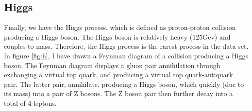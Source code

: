 \subsection*{Higgs}
Finally, we have the Higgs process, which is defined as proton-proton collision producing a Higgs boson. The Higgs boson is relatively heavy (125Gev) and couples to mass. Therefore, the 
Higgs process is the rarest process in the data set. In figure \ref{fig:h}, I have drawn a Feynman diagram of a collision producing a Higgs boson. The Feynman diagram displays a gluon pair annihilation
through exchanging a virtual top quark, and producing a virtual top quark-antiquark pair. The latter pair, annihilate, producing a Higgs boson, which quickly (due to its mass) into a 
pair of Z bosons. The Z boson pair then further decay into a total of 4 leptons. 

